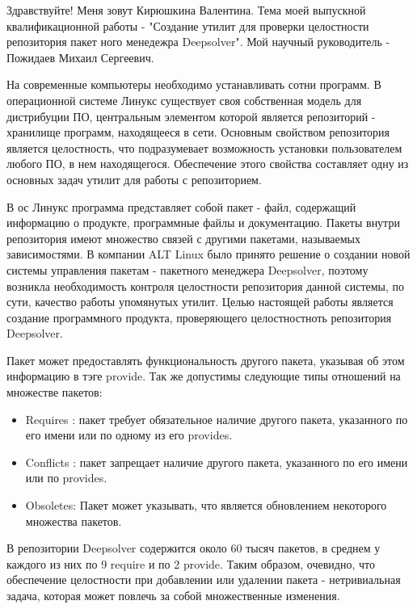 \documentclass[a4paper]{article}
\begin{document}
\huge

Здравствуйте!
Меня зовут Кирюшкина Валентина. Тема моей выпускной квалификационной
работы - "Создание утилит для проверки целостности репозитория пакет
ного менедежра Deepsolver". Мой научный руководитель - Пожидаев
Михаил Сергеевич.

\newpage
На современные компьютеры необходимо устанавливать сотни программ.
В операционной системе Линукс существует своя собственная модель 
для дистрибуции ПО, центральным элементом которой является репозиторий 
- хранилище программ, находящееся в сети. Основным свойством репозитория
является целостность, что подразумевает возможность установки 
пользователем любого ПО, в нем находящегося. Обеспечение этого 
свойства составляет одну из основных задач утилит для работы с 
репозиторием. 

В ос Линукс программа представляет собой пакет - файл, содержащий 
информацию о продукте, программные файлы и документацию. 
Пакеты внутри репозитория имеют множество связей с другими пакетами, 
называемых зависимостями. 
\newpage
В компании  ALT Linux было принято решение о создании новой системы
управления пакетам  - пакетного менеджера Deepsolver, поэтому возникла 
необходимость контроля целостности репозитория данной системы, по сути, 
качество работы упомянутых утилит. %
\newpage
Целью настоящей работы является создание программного 
продукта, проверяющего целостностноть репозитория Deepsolver.
\newpage



 Пакет может предоставлять функциональность другого пакета, указывая об 
этом информацию в тэге provide. 
Так же допустимы следующие типы отношений на множестве пакетов:
\begin{itemize}
\item
Requires : пакет требует обязательное наличие другого пакета, указанного 
по его имени или по одному из его provides.
\item
Conflicts :
пакет запрещает наличие другого пакета, указанного по его имени или по
provides.
\item 
Obsoletes: Пакет может указывать, что является обновлением некоторого 
множества пакетов. 
\end{itemize}

\newpage

В репозитории Deepsolver содержится около 60 тысяч пакетов, в среднем у каждого 
из них по 9 require и по 2 provide.
Таким образом, очевидно, что обеспечение целостности при добавлении или удалении пакета - 
нетривиальная задача, которая может повлечь за собой множественные изменения.
\end{document}
